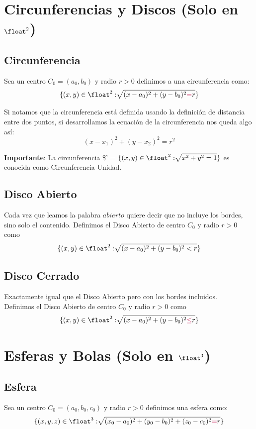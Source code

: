 \documentclass[10pt,a4paper]{article}
\begin{document}
\section*{Circunferencias y Discos (Solo en $\float^{2}$)}
\subsection*{Circunferencia}
Sea un centro $C_{0} = (a_{0}, b_{0})$ y radio $r > 0$ definimos a una circunferencia como: 
\[\{(x, y) \in \float^{2}: \sqrt[]{(x - a_{0})^{2} + (y - b_{0})^{2} \textcolor{purple}{=} r}\}\] 

Si notamos que la circunferencia está definida usando la definición de distancia entre dos puntos, si desarrollamos la ecuación de la circunferencia nos queda algo así: 
\[(x-x_{1})^{2} + (y-x_{2})^{2} = r^{2}\]

\textbf{Importante}: La circunferencia \$' =  $\{(x, y) \in \float^{2}: \sqrt[]{x^{2} + y^{2} = 1}\}$ es conocida como Circunferencia Unidad.
\subsection*{Disco Abierto}
Cada vez que leamos la palabra $abierto$ quiere decir que no incluye los bordes, sino solo el contenido.
Definimos el Disco Abierto de centro $C_{0}$ y radio $r > 0$ como 
\[\{(x, y) \in \float^{2}: \sqrt[]{(x - a_{0})^{2} + (y - b_{0})^{2} < r}\}\]

\subsection*{Disco Cerrado}
Exactamente igual que el Disco Abierto pero con los bordes incluidos. \\ 
Definimos el Disco Abierto de centro $C_{0}$ y radio $r > 0$ como 
\[\{(x, y) \in \float^{2}: \sqrt[]{(x - a_{0})^{2} + (y - b_{0})^{2} \textcolor{purple}{\le} r}\}\]
\section*{Esferas y Bolas (Solo en $\float^{3}$)}
\subsection*{Esfera}
Sea un centro $ C_{0} = (a_{0}, b_{0}, c_{0})$ y radio $r > 0$ definimos una esfera como: 
\[\{(x, y, z) \in \float^{3}: \sqrt[]{(x_{0} - a_{0})^{2} + (y_{0} - b_{0})^{2} + (z_{0} - c_{0})^{2} \textcolor{purple}{=} r}\}\]
\end{document}
